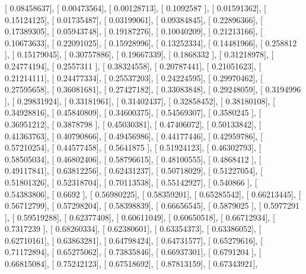 \documentclass{article}
\begin{document}
       [ 0.08458637],
       [ 0.00473564],
       [ 0.00128713],
       [ 0.1092587 ],
       [ 0.01591362],
       [ 0.15124125],
       [ 0.01735487],
       [ 0.03199061],
       [ 0.09384845],
       [ 0.22896366],
       [ 0.17389305],
       [ 0.05943748],
       [ 0.19187276],
       [ 0.10040209],
       [ 0.21213166],
       [ 0.10673633],
       [ 0.22091025],
       [ 0.15928996],
       [ 0.13252334],
       [ 0.14481966],
       [ 0.258812  ],
       [ 0.15179045],
       [ 0.30757886],
       [ 0.19667339],
       [ 0.1868332 ],
       [ 0.31218978],
       [ 0.24774194],
       [ 0.2557311 ],
       [ 0.38324558],
       [ 0.20787441],
       [ 0.21051623],
       [ 0.21214111],
       [ 0.24477334],
       [ 0.25537203],
       [ 0.24224595],
       [ 0.29970462],
       [ 0.27595658],
       [ 0.36081681],
       [ 0.27427182],
       [ 0.33083848],
       [ 0.29248059],
       [ 0.3194996 ],
       [ 0.29831924],
       [ 0.33181961],
       [ 0.31402437],
       [ 0.32858452],
       [ 0.38180108],
       [ 0.34928816],
       [ 0.45840809],
       [ 0.34600375],
       [ 0.54569307],
       [ 0.3580245 ],
       [ 0.36951212],
       [ 0.3878798 ],
       [ 0.45030381],
       [ 0.47406072],
       [ 0.50133842],
       [ 0.41363763],
       [ 0.40790866],
       [ 0.49456986],
       [ 0.44177446],
       [ 0.42959786],
       [ 0.57210254],
       [ 0.44577458],
       [ 0.5641875 ],
       [ 0.51924123],
       [ 0.46302793],
       [ 0.58505034],
       [ 0.46802406],
       [ 0.58796615],
       [ 0.48100555],
       [ 0.4868412 ],
       [ 0.49117841],
       [ 0.63812256],
       [ 0.62431237],
       [ 0.50718029],
       [ 0.51227054],
       [ 0.51801326],
       [ 0.52318704],
       [ 0.70113538],
       [ 0.55142927],
       [ 0.540866  ],
       [ 0.54383806],
       [ 0.6692    ],
       [ 0.56980225],
       [ 0.58359201],
       [ 0.65285542],
       [ 0.66213445],
       [ 0.56712799],
       [ 0.57298204],
       [ 0.58398839],
       [ 0.66656545],
       [ 0.5879025 ],
       [ 0.5977291 ],
       [ 0.59519288],
       [ 0.62377408],
       [ 0.60611049],
       [ 0.60650518],
       [ 0.66712934],
       [ 0.7317239 ],
       [ 0.68260334],
       [ 0.62380601],
       [ 0.63354373],
       [ 0.63386052],
       [ 0.62710161],
       [ 0.63863281],
       [ 0.64798424],
       [ 0.64731577],
       [ 0.65279616],
       [ 0.71172894],
       [ 0.65275062],
       [ 0.73835846],
       [ 0.66937301],
       [ 0.6791204 ],
       [ 0.66815084],
       [ 0.75242123],
       [ 0.67518692],
       [ 0.87813159],
       [ 0.67343921],
\end{document}
